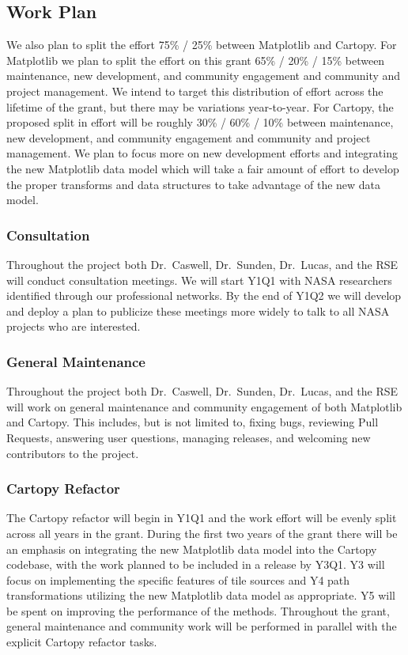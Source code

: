\documentclass[12pt]{article}
\numberwithin{page}{section}
\begin{document}
\subsection{Work Plan}

We also plan to split the effort 75\% / 25\% between
Matplotlib and Cartopy.  For Matplotlib we plan to split the effort on this
grant 65\% / 20\% / 15\% between maintenance, new development, and community
engagement and community and project management.  We intend to target this distribution
of effort across the lifetime of the grant, but there may be variations year-to-year.
For Cartopy, the proposed split in effort will be roughly 30\% / 60\% / 10\%
between maintenance, new development, and community engagement and community
and project management.  We plan to focus more on new development efforts and
integrating the new Matplotlib data model which will take a fair amount of
effort to develop the proper transforms and data structures to take advantage
of the new data model.

\subsubsection{Consultation}
Throughout the project both Dr.\ Caswell, Dr.\ Sunden, Dr.\ Lucas, and the RSE
will conduct consultation meetings.  We will start Y1Q1 with NASA researchers
identified through our professional networks.  By the end of Y1Q2 we will
develop and deploy a plan to publicize these meetings more widely to talk to
all NASA projects who are interested.

\subsubsection{General Maintenance}

Throughout the project both Dr.\ Caswell, Dr.\ Sunden, Dr.\ Lucas, and the RSE
will work on general maintenance and community engagement of both Matplotlib
and Cartopy.  This includes, but is not limited to, fixing bugs, reviewing Pull
Requests, answering user questions, managing releases, and welcoming new
contributors to the project.


\subsubsection{Cartopy Refactor}

The Cartopy refactor will begin in Y1Q1
and the work effort will be evenly split across all years in the grant.
During the first two years of the grant there will be an emphasis on
integrating the new Matplotlib data model into the Cartopy codebase,
with the work planned to be included in a release by Y3Q1.
Y3 will focus on implementing the specific
features of tile sources and Y4 path transformations utilizing the new
Matplotlib data model as appropriate. Y5 will be spent on
improving the performance of the methods. Throughout the grant, general
maintenance and community work will be performed in parallel with the
explicit Cartopy refactor tasks.
\end{document}
